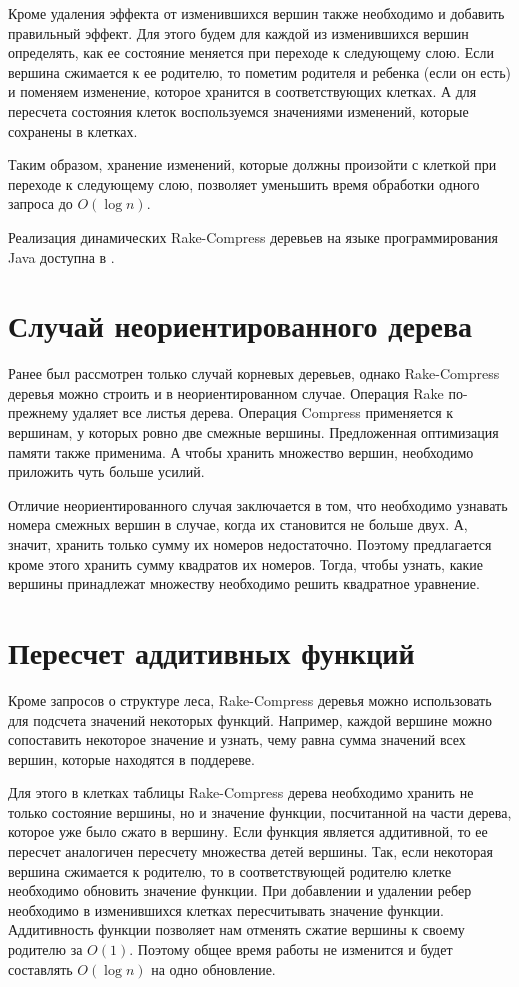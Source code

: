 Кроме удаления эффекта от изменившихся вершин также необходимо и добавить правильный эффект. 
Для этого будем для каждой из изменившихся вершин определять, как ее состояние меняется при переходе к следующему слою.
Если вершина сжимается к ее родителю, то пометим родителя и ребенка (если он есть) и поменяем изменение, которое хранится в соответствующих клетках. 
А для пересчета состояния клеток воспользуемся значениями изменений, которые сохранены в клетках.
  
Таким образом, хранение изменений, которые должны произойти с клеткой при переходе к следующему слою, позволяет уменьшить время обработки одного запроса до $O(\log n)$. 

Реализация динамических Rake-Compress деревьев на языке программирования Java доступна в \cite{github}.

\FloatBarrier
\section{Случай неориентированного дерева}
\label{sec:undirected}

Ранее был рассмотрен только случай корневых деревьев, однако Rake-Compress деревья можно строить и в неориентированном случае.
Операция Rake по-прежнему удаляет все листья дерева. Операция Compress применяется к вершинам, у которых ровно две смежные вершины. 
Предложенная оптимизация памяти также применима. А чтобы хранить множество вершин, необходимо приложить чуть больше усилий.

Отличие неориентированного случая заключается в том, что необходимо узнавать номера смежных вершин в случае, когда их становится не больше двух. 
А, значит, хранить только сумму их номеров недостаточно. Поэтому предлагается кроме этого хранить сумму квадратов их номеров. Тогда, чтобы узнать, 
какие вершины принадлежат множеству необходимо решить квадратное уравнение.

\FloatBarrier
\section{Пересчет аддитивных функций}

Кроме запросов о структуре леса, Rake-Compress деревья можно использовать для подсчета значений некоторых функций. 
Например, каждой вершине можно сопоставить некоторое значение и узнать, чему равна сумма значений всех вершин, которые находятся в поддереве.

Для этого в клетках таблицы Rake-Compress дерева необходимо хранить не только состояние вершины, но и значение функции, посчитанной на части дерева, которое уже было сжато в вершину. 
Если функция является аддитивной, то ее пересчет аналогичен пересчету множества детей вершины. 
Так, если некоторая вершина сжимается к родителю, то в соответствующей родителю клетке необходимо обновить значение функции. 
При добавлении и удалении ребер необходимо в изменившихся клетках пересчитывать значение функции. 
Аддитивность функции позволяет нам отменять сжатие вершины к своему родителю за $O(1)$. Поэтому общее время работы не изменится и будет составлять $O(\log n)$ на одно обновление.

